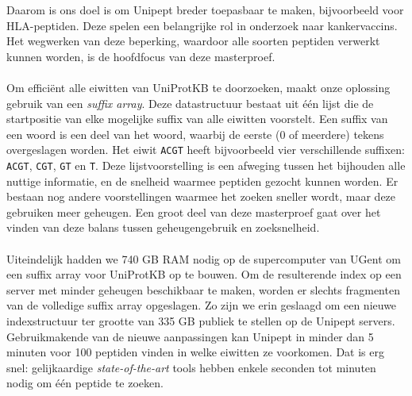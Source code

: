 Daarom is ons doel is om Unipept breder toepasbaar te maken, bijvoorbeeld voor HLA-peptiden.
Deze spelen een belangrijke rol in onderzoek naar kankervaccins.
Het wegwerken van deze beperking, waardoor alle soorten peptiden verwerkt kunnen worden, is de hoofdfocus van deze masterproef.
\\ \\
Om efficiënt alle eiwitten van UniProtKB te doorzoeken, maakt onze oplossing gebruik van een \textit{suffix array}.
Deze datastructuur bestaat uit één lijst die de startpositie van elke mogelijke suffix van alle eiwitten voorstelt.
Een suffix van een woord is een deel van het woord, waarbij de eerste (0 of meerdere) tekens overgeslagen worden.
Het eiwit \texttt{ACGT} heeft bijvoorbeeld vier verschillende suffixen:
\texttt{ACGT}, \texttt{CGT}, \texttt{GT} en \texttt{T}.
Deze lijstvoorstelling is een afweging tussen het bijhouden alle nuttige informatie, en de snelheid waarmee peptiden gezocht kunnen worden.
Er bestaan nog andere voorstellingen waarmee het zoeken sneller wordt, maar deze gebruiken meer geheugen.
Een groot deel van deze masterproef gaat over het vinden van deze balans tussen geheugengebruik en zoeksnelheid.
\\ \\
Uiteindelijk hadden we 740 GB RAM nodig op de supercomputer van UGent om een suffix array voor UniProtKB op te bouwen.
Om de resulterende index op een server met minder geheugen beschikbaar te maken, worden er slechts fragmenten van de volledige suffix array opgeslagen.
Zo zijn we erin geslaagd om een nieuwe indexstructuur ter grootte van 335 GB publiek te stellen op de Unipept servers.
Gebruikmakende van de nieuwe aanpassingen kan Unipept in minder dan 5 minuten voor 100 peptiden vinden in welke eiwitten ze voorkomen.
Dat is erg snel: gelijkaardige \textit{state-of-the-art} tools hebben enkele seconden tot minuten nodig om één peptide te zoeken.
\afterpage{\blankpage}